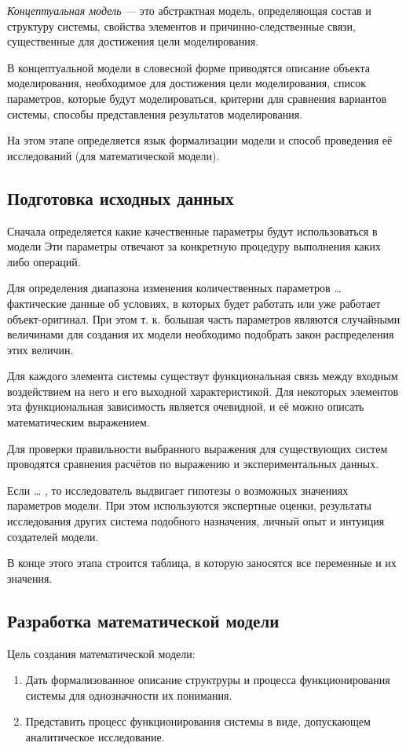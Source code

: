 \documentclass[12pt, russian, oneside, article]{ncc}
\begin{document}
\emph{Концептуальная модель} --- это абстрактная модель, определяющая состав и структуру системы, свойства элементов и причинно-следственные связи, существенные для достижения цели моделирования.

В концептуальной модели в словесной форме приводятся описание объекта моделирования, необходимое для достижения цели моделирования, список параметров, которые будут моделироваться, критерии для сравнения вариантов системы, способы представления результатов моделирования.

На этом этапе определяется язык формализации модели и способ проведения её исследований (для математической модели).
\subsection{Подготовка исходных данных}
\label{sec-4_3}


Сначала определяется какие качественные параметры будут использоваться в модели Эти параметры отвечают за конкретную процедуру выполнения каких либо операций.

Для определения диапазона изменения количественных параметров \ldots{} фактические данные об условиях, в которых будет работать или уже работает объект-оригинал. При этом т. к. большая часть параметров являются случайными величинами для создания их модели необходимо подобрать закон распределения этих величин.

Для каждого элемента системы существут функциональная связь между входным воздействием на него и его выходной характеристикой. Для некоторых элементов эта функциональная зависимость является очевидной, и её можно описать математическим выражением.

Для проверки правильности выбранного выражения для существующих систем проводятся сравнения расчётов по выражению и экспериментальных данных.

Если \ldots{} , то исследователь выдвигает гипотезы о возможных значениях параметров модели. При этом используются экспертные оценки, результаты исследования других система подобного назначения, личный опыт и интуиция создателей модели.

В конце этого этапа строится таблица, в которую заносятся все переменные и их значения.
\subsection{Разработка математической модели}
\label{sec-4_4}


Цель создания математической модели:
\begin{enumerate}
\item Дать формализованное описание структруры и процесса функционирования системы для однозначности их понимания.
\item Представить процесс функционирования системы в виде, допускающем аналитическое исследование.
\end{enumerate}
\end{document}
